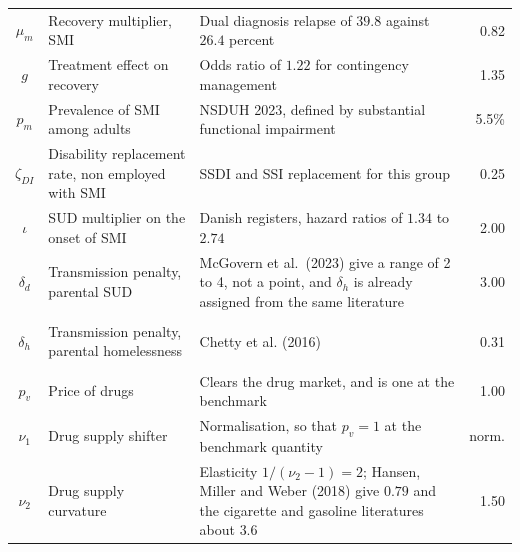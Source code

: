 \begin{longtable}{@{}cL{4.6cm}L{7.1cm}r@{}}
$\mu_m$ & Recovery multiplier, SMI & Dual diagnosis relapse of $39.8$ against $26.4$ percent & 0.82 \\
$g$ & Treatment effect on recovery & Odds ratio of $1.22$ for contingency management & 1.35 \\
$p_m$ & Prevalence of SMI among adults & NSDUH 2023, defined by substantial functional impairment & 5.5\% \\
$\zeta_{DI}$ & Disability replacement rate, non employed with SMI & SSDI and SSI replacement for this group & 0.25 \\
$\iota$ & SUD multiplier on the onset of SMI & Danish registers, hazard ratios of $1.34$ to $2.74$ & 2.00 \\
$\delta_d$ & Transmission penalty, parental SUD & McGovern et al.\ (2023) give a range of 2 to 4, not a point, and $\delta_h$ is already assigned from the same literature & 3.00 \\
\addlinespace
{} \\
$\delta_h$ & Transmission penalty, parental homelessness & Chetty et al. (2016) & 0.31 \\
\addlinespace
{} \\
$p_v$ & Price of drugs & Clears the drug market, and is one at the benchmark & 1.00 \\
$\nu_1$ & Drug supply shifter & Normalisation, so that $p_v=1$ at the benchmark quantity & norm. \\
$\nu_2$ & Drug supply curvature & Elasticity $1/(\nu_2-1)=2$; Hansen, Miller and Weber (2018) give $0.79$ and the cigarette and gasoline literatures about $3.6$ & 1.50 \\
\bottomrule
\end{longtable}
